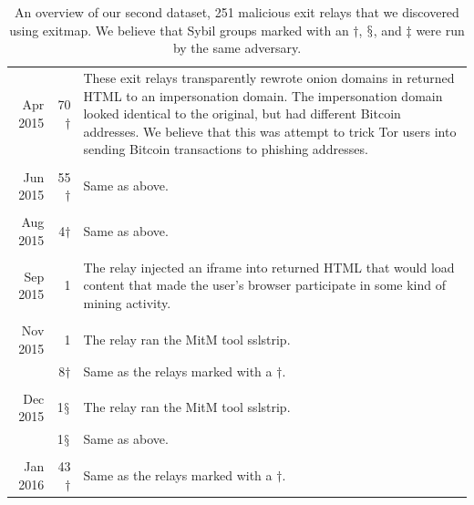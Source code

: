 \begin{table}
\begin{tabularx}{\textwidth}{r r X}
Apr 2015 & 70$\dagger$ & These exit relays transparently rewrote onion domains
in returned HTML to an impersonation domain.  The impersonation domain looked
identical to the original, but had different Bitcoin addresses.  We believe that
this was attempt to trick Tor users into sending Bitcoin transactions to
phishing addresses. \\

& & \\

Jun 2015 & 55$\dagger$ & Same as above. \\

& & \\

Aug 2015 & 4$\dagger$ & Same as above. \\

& & \\

Sep 2015 & 1 & The relay injected an iframe into returned HTML that would load
content that made the user's browser participate in some kind of mining
activity. \\

& & \\

Nov 2015 & 1 & The relay ran the MitM tool sslstrip. \\

& 8$\dagger$ & Same as the relays marked with a $\dagger$. \\

& & \\

Dec 2015 & 1$\mathsection$ & The relay ran the MitM tool sslstrip. \\

& 1$\mathsection$ & Same as above. \\

& & \\

Jan 2016 & 43$\dagger$ & Same as the relays marked with a $\dagger$. \\
\bottomrule
\end{tabularx}
\caption{An overview of our second dataset, 251 malicious exit relays that we
discovered using exitmap.  We believe that Sybil groups marked with an
$\dagger$, $\mathsection$, and $\ddagger$ were run by the same adversary.}
\label{tab:exitmap-dataset}
\end{table}

